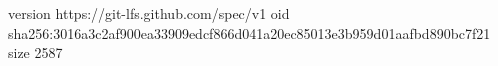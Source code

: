 version https://git-lfs.github.com/spec/v1
oid sha256:3016a3c2af900ea33909edcf866d041a20ec85013e3b959d01aafbd890bc7f21
size 2587
